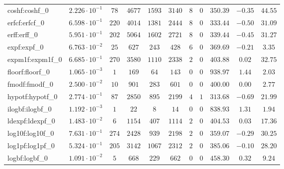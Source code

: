 \begin{tabular}{|l|c|c|c|c|c|c|c|c|c|c|}
coshf:coshf\_0               & $ 2.226 \cdot 10^{-1} $ & $ 78     $ & $ 4677  $ & $ 1593  $ & $ 3140  $ & $ 8   $ & $ 0 $ & $ 350.39      $ & $ -0.35   $ & $ 44.55   $ \\
erfcf:erfcf\_0               & $ 6.598 \cdot 10^{-1} $ & $ 220    $ & $ 4014  $ & $ 1381  $ & $ 2444  $ & $ 8   $ & $ 0 $ & $ 333.44      $ & $ -0.50   $ & $ 31.09   $ \\
erff:erff\_0                 & $ 5.951 \cdot 10^{-1} $ & $ 202    $ & $ 5064  $ & $ 1602  $ & $ 2721  $ & $ 8   $ & $ 0 $ & $ 339.44      $ & $ -0.45   $ & $ 31.27   $ \\
expf:expf\_0                 & $ 6.763 \cdot 10^{-2} $ & $ 25     $ & $ 627   $ & $ 243   $ & $ 428   $ & $ 6   $ & $ 0 $ & $ 369.69      $ & $ -0.21   $ & $ 3.35    $ \\
expm1f:expm1f\_0             & $ 6.685 \cdot 10^{-1} $ & $ 270    $ & $ 3580  $ & $ 1110  $ & $ 2338  $ & $ 2   $ & $ 0 $ & $ 403.88      $ & $ 0.02    $ & $ 32.75   $ \\
floorf:floorf\_0             & $ 1.065 \cdot 10^{-3} $ & $ 1      $ & $ 169   $ & $ 64    $ & $ 143   $ & $ 0   $ & $ 0 $ & $ 938.97      $ & $ 1.44    $ & $ 2.03    $ \\
fmodf:fmodf\_0               & $ 2.500 \cdot 10^{-2} $ & $ 10     $ & $ 901   $ & $ 283   $ & $ 601   $ & $ 0   $ & $ 0 $ & $ 400.00      $ & $ 0.00    $ & $ 2.77    $ \\
hypotf:hypotf\_0             & $ 2.774 \cdot 10^{-1} $ & $ 87     $ & $ 2850  $ & $ 895   $ & $ 2199  $ & $ 4   $ & $ 1 $ & $ 313.68      $ & $ -0.69   $ & $ 21.99   $ \\
ilogbf:ilogbf\_0             & $ 1.192 \cdot 10^{-3} $ & $ 1      $ & $ 22    $ & $ 8     $ & $ 14    $ & $ 0   $ & $ 0 $ & $ 838.93      $ & $ 1.31    $ & $ 1.94    $ \\
ldexpf:ldexpf\_0             & $ 1.483 \cdot 10^{-2} $ & $ 6      $ & $ 1154  $ & $ 407   $ & $ 1114  $ & $ 2   $ & $ 0 $ & $ 404.53      $ & $ 0.03    $ & $ 17.36   $ \\
log10f:log10f\_0             & $ 7.631 \cdot 10^{-1} $ & $ 274    $ & $ 2428  $ & $ 939   $ & $ 2198  $ & $ 2   $ & $ 0 $ & $ 359.07      $ & $ -0.29   $ & $ 30.25   $ \\
log1pf:log1pf\_0             & $ 5.324 \cdot 10^{-1} $ & $ 205    $ & $ 3142  $ & $ 1067  $ & $ 2312  $ & $ 2   $ & $ 0 $ & $ 385.06      $ & $ -0.10   $ & $ 28.20   $ \\
logbf:logbf\_0               & $ 1.091 \cdot 10^{-2} $ & $ 5      $ & $ 668   $ & $ 229   $ & $ 662   $ & $ 0   $ & $ 0 $ & $ 458.30      $ & $ 0.32    $ & $ 9.24    $ \\

\end{tabular}
